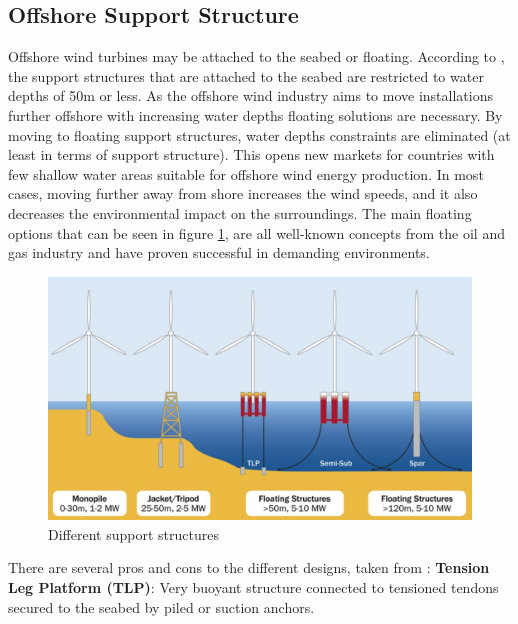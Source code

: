 \subsection{Offshore Support Structure}
Offshore wind turbines may be attached to the seabed or floating. According to \cite{IRENA2016}, the support structures that are attached to the seabed are restricted to water depths of 50m or less. As the offshore wind industry aims to move installations further offshore with increasing water depths floating solutions are necessary. By moving to floating support structures, water depths constraints are eliminated (at least in terms of support structure). This opens new markets for countries with few shallow water areas suitable for offshore wind energy production. In most cases, moving further away from shore increases the wind speeds, and it also decreases the environmental impact on the surroundings. The main floating options that can be seen in figure \ref{fig:supstruc}, are all well-known concepts from the oil and gas industry and have proven successful in demanding environments. 

\begin{figure}[H]
\centering
\includegraphics[scale=0.6]{figures/supstruc}
\caption[$\; \:$Different support structures]{Different support structures \cite{Bailey2014}}
 \label{fig:supstruc}
\end{figure}

\noindent There are several pros and cons to the different designs, taken from \cite{IRENA2016}: \newline
\newline
\textbf{Tension Leg Platform (TLP)}: Very buoyant structure connected to tensioned tendons secured to the seabed by piled or suction anchors.

